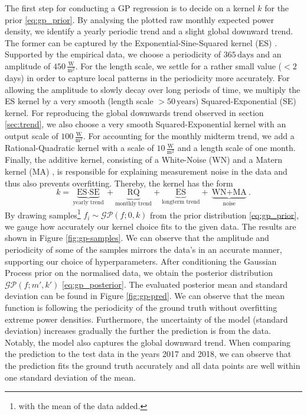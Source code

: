 \documentclass{article}
\theoremstyle{plain}
\theoremstyle{definition}
\theoremstyle{remark}
\begin{document}
The first step for conducting a GP regression is to decide on a kernel $k$ for the prior \eqref{eq:gp_prior}. By analysing the plotted raw monthly expected power density, we identify a yearly periodic trend and a slight global downward trend. The former can be captured by the Exponential-Sine-Squared kernel (ES) \cite{MacKay1998IntroductionTG}. Supported by the empirical data, we choose a periodicity of $365 \, \text{days}$ and an amplitude of $450 \, \frac{\textrm{W}}{\text{m}^2}$. For the length scale, we settle for a rather small value ($< 2 \, $ days) in order to capture local patterns in the periodicity more accurately. For allowing the amplitude to slowly decay over long periods of time, we multiply the ES kernel by a very smooth (length scale $> 50 \, \text{years}$) Squared-Exponential (SE) kernel. For reproducing the global downwards trend observed in section \ref{sec:trend}, we also choose a very smooth Squared-Exponential kernel with an output scale of $100 \, \frac{\textrm{W}}{\text{m}^2}$. For accounting for the monthly midterm trend, we add a Rational-Quadratic kernel \cite{rasmussen-williams-gp} with a scale of $10 \, \frac{\textrm{W}}{\text{m}^2}$ and a length scale of one month. Finally, the additive kernel, consisting of a White-Noise (WN) and a Matern kernel (MA) \cite{abramowitz1968handbook}, is responsible for explaining measurement noise in the data and thus also prevents overfitting. Thereby, the kernel has the form
$$k = \underbrace{\text{ES} \cdot \text{SE}}_{\text{yearly trend}} + \underbrace{\text{RQ}}_\text{monthly trend} + \underbrace{\text{ES}}_\text{longterm trend} + \underbrace{\text{WN} + \text{MA}}_{\text{noise}}.$$
By drawing samples\footnote{with the mean of the data added.} $f_i \sim \mathcal{GP}(f; 0, k)$ from the prior distribution \eqref{eq:gp_prior}, we gauge how accurately our kernel choice fits to the given data. The results are shown in Figure \ref{fig:gp-samples}. We can observe that the amplitude and periodicity of some of the samples mirrors the data's in an accurate manner, supporting our choice of hyperparameters. After conditioning the Gaussian Process prior on the normalised data, we obtain the posterior distribution $\mathcal{GP}(f; m', k')$ \eqref{eq:gp_posterior}. The evaluated posterior mean and standard deviation can be found in Figure \ref{fig:gp-pred}. We can observe that the mean function is following the periodicity of the ground truth without overfitting extreme power densities. Furthermore, the uncertainty of the model (standard deviation) increases gradually the further the prediction is from the data. Notably, the model also captures the global downward trend. When comparing the prediction to the test data in the years 2017 and 2018, we can observe that the prediction fits the ground truth accurately and all data points are well within one standard deviation of the mean.
\end{document}
